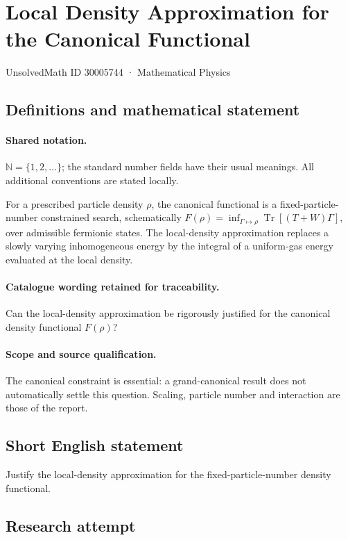 \documentclass[11pt]{article}
\begin{document}
\setcounter{section}{30005743}
\section{Local Density Approximation for the Canonical Functional}\label{30005744}
{\small UnsolvedMath ID 30005744 · Mathematical Physics}
\subsection{Definitions and mathematical statement}

\paragraph{Shared notation.}$\mathbb N=\{1,2,\ldots\}$; the standard number fields have their usual meanings. All additional conventions are stated locally.


For a prescribed particle density $\rho$, the canonical functional is a fixed-particle-number constrained search, schematically $F(\rho)=\inf_{\Gamma\mapsto\rho}\operatorname{Tr}[(T+W)\Gamma]$, over admissible fermionic states. The local-density approximation replaces a slowly varying inhomogeneous energy by the integral of a uniform-gas energy evaluated at the local density.

\paragraph{Catalogue wording retained for traceability.}
Can the local-density approximation be rigorously justified for the canonical density functional $F(\rho)$?

\paragraph{Scope and source qualification.}The canonical constraint is essential: a grand-canonical result does not automatically settle this question. Scaling, particle number and interaction are those of the report.
\subsection{Short English statement}
Justify the local-density approximation for the fixed-particle-number density functional.
\subsection{Research attempt}
\end{document}
